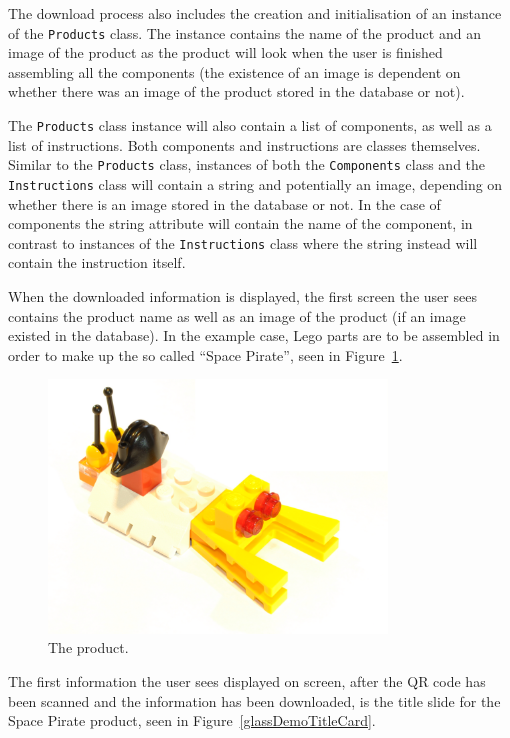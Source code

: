 The download process also includes the creation and initialisation of an instance of the \texttt{Products} class. The instance contains the name of the product and an image of the product as the product will look when the user is finished assembling all the components (the existence of an image is dependent on whether there was an image of the product stored in the database or not).

The \texttt{Products} class instance will also contain a list of components, as well as a list of instructions. Both components and instructions are classes themselves. Similar to the \texttt{Products} class, instances of both the \texttt{Components} class and the \texttt{Instructions} class will contain a string and potentially an image, depending on whether there is an image stored in the database or not. In the case of components the string attribute will contain the name of the component, in contrast to instances of the \texttt{Instructions} class where the string instead will contain the instruction itself.

When the downloaded information is displayed, the first screen the user sees contains the product name as well as an image of the product (if an image existed in the database). In the example case, Lego parts are to be assembled in order to make up the so called ``Space Pirate'', seen in Figure~\ref{glassDemoRaw}.

	\begin{figure}[ht!]
		\centering
		\includegraphics[width=90mm]{images/rawImages/BILD_6}
		\caption{The product.}
		\label{glassDemoRaw}
	\end{figure}

The first information the user sees displayed on screen, after the QR code has been scanned and the information has been downloaded, is the title slide for the Space Pirate product, seen in Figure~\ref{glassDemoTitleCard}.

